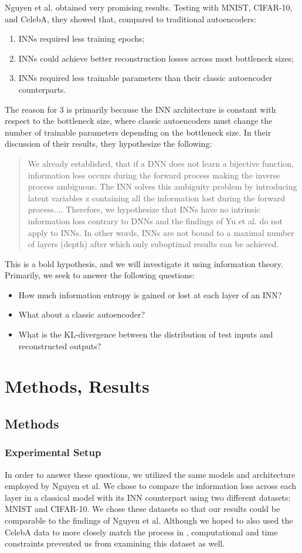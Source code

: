 \documentclass[11pt,letterpaper]{article}
\begin{document}
Nguyen et al. obtained very promising results.
Testing with MNIST, CIFAR-10, and CelebA, they showed that, compared to traditional autoencoders: \begin{enumerate}
   \item INNs required less training epochs;
   \item INNs could achieve better reconstruction losses across most bottleneck sizes;
   \item INNs required less trainable parameters than their classic autoencoder counterparts.
\end{enumerate}
The reason for 3 is primarily because the INN architecture is constant with respect to the bottleneck size, where classic autoencoders must change the number of trainable parameters depending on the bottleneck size. In their discussion of their results, they hypothesize the following:
\begin{quotation}
   We already established, that if a DNN does not learn a bijective function, information loss occurs during the forward process making the inverse process ambiguous. The INN solves this ambiguity problem by introducing latent variables z containing all the information lost during the forward process.... Therefore, we hypothesize that INNs have no intrinsic information loss contrary to DNNs and the findings of Yu et al. do not apply to INNs. In other words, INNs are not bound to a maximal number of layers (depth) after which only suboptimal results can be achieved.
\end{quotation}
This is a bold hypothesis, and we will investigate it using information theory.
Primarily, we seek to answer the following questions: \begin{itemize}
   \item How much information entropy is gained or lost at each layer of an INN?
   \item What about a classic autoencoder?
   \item What is the KL-divergence between the distribution of test inputs and reconstructed outputs?
\end{itemize}


\section{Methods, Results}
\subsection{Methods}
   \subsubsection{Experimental Setup}
     In order to answer these questions, we utilized the same models and architecture employed by Nguyen et al.
     We chose to compare the information loss across each layer in a classical model with its INN counterpart using two different datasets: MNIST and CIFAR-10. We chose these datasets so that our results could be comparable to the findings of Nguyen et al. Although we hoped to also used the CelebA data to more closely match the process in \cite{Nguyen2019}, computational and time constraints prevented us from examining this dataset as well.
\end{document}
